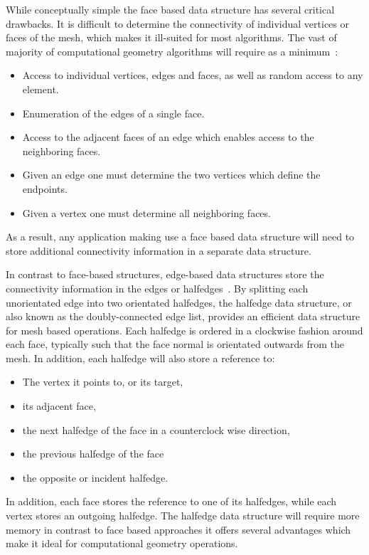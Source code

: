 While conceptually simple the face based data structure has several critical drawbacks.
It is difficult to determine the connectivity of individual vertices or faces of the mesh, which makes it ill-suited for most algorithms.
The vast of majority of computational geometry algorithms will require as a minimum~\cite{botsch2010}:
\begin{itemize}
    \item Access to individual vertices, edges and faces, as well as random access to any element.
    \item Enumeration of the edges of a single face.
    \item Access to the adjacent faces of an edge which enables access to the neighboring faces.
    \item Given an edge one must determine the two vertices which define the endpoints.
    \item Given a vertex one must determine all neighboring faces.
\end{itemize}
As a result, any application making use a face based data structure will need to store additional connectivity information in a separate data structure.

In contrast to face-based structures, edge-based data structures store the connectivity information in the edges or halfedges~\cite{botsch2010,orourke1998,berg2008}.
By splitting each unorientated edge into two orientated halfedges, the halfedge data structure, or also known as the doubly-connected edge list, provides an efficient data structure for mesh based operations.
Each halfedge is ordered in a clockwise fashion around each face, typically such that the face normal is orientated outwards from the mesh.
In addition, each halfedge will also store a reference to:
\begin{itemize}
    \item The vertex it points to, or its target,
    \item its adjacent face,
    \item the next halfedge of the face in a counterclock wise direction,
    \item the previous halfedge of the face
    \item the opposite or incident halfedge.
\end{itemize}
In addition, each face stores the reference to one of its halfedges, while each vertex stores an outgoing halfedge. 
The halfedge data structure will require more memory in contrast to face based approaches it offers several advantages which make it ideal for computational geometry operations.

